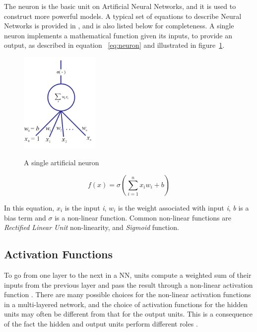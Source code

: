 The neuron is the basic unit on Artificial Neural Networks, and it is used to construct more powerful models. A typical set of equations to describe Neural Networks is provided in \cite{williams1986learning}, and is also listed below for completeness. A single neuron implements a mathematical function given its inputs, to provide an output, as described in equation ~\ref{eq:neuron} and illustrated in figure~\ref{fig:neuron}.

\begin{figure}[H]
	\centering
	{\includegraphics[width=0.34\textwidth]{images/neuron2}}
	\caption{A single artificial neuron}
	\label{fig:neuron}
\end{figure}

\begin{equation}
f(x) = \sigma(\sum\limits_{i=1}^{n}x_iw_i + b) 
\label{eq:neuron}
\end{equation}

In this equation, $x_i$ is the input \textit{i}, $w_i$ is the weight associated with input \textit{i}, \textit{b} is a bias term and $\sigma$ is a non-linear function. Common non-linear functions are \textit{Rectified Linear Unit} non-linearity, and\textit{ Sigmoid} function.

\subsection{Activation Functions}
\label{sec:actfun}
To go from one layer to the next in a NN, units compute a weighted sum of their inputs from the previous layer and pass the result through a non-linear activation function \cite{lecun2015deep}. There are many possible choices for the non-linear activation functions in a multi-layered network, and the choice of activation functions for the hidden units may often be different from that for the output units. This is a consequence of the fact the hidden and output units perform different roles \cite{bishop1995neural}. 

